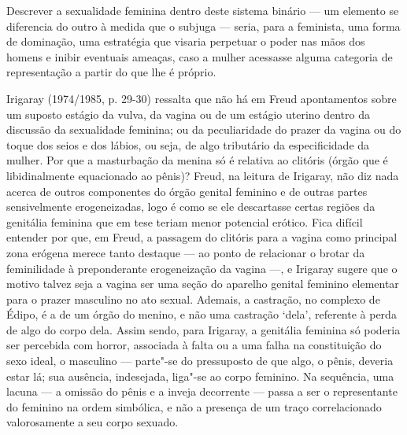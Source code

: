 Descrever a sexualidade feminina dentro deste sistema binário --- um
elemento se diferencia do outro à medida que o subjuga --- seria, para a
feminista, uma forma de dominação, uma estratégia que visaria perpetuar
o poder nas mãos dos homens e inibir eventuais ameaças, caso a mulher
acessasse alguma categoria de representação a partir do que lhe é
próprio.

Irigaray (1974/1985, p. 29-30) ressalta que não há em Freud
apontamentos sobre um suposto estágio da vulva, da vagina ou de um
estágio uterino dentro da discussão da sexualidade feminina; ou da
peculiaridade do prazer da vagina ou do toque dos seios e dos lábios, ou
seja, de algo tributário da especificidade da mulher. Por que a
masturbação da menina só é relativa ao clitóris (órgão que é
libidinalmente equacionado ao pênis)? Freud, na leitura de Irigaray, não
diz nada acerca de outros componentes do órgão genital feminino e de
outras partes sensivelmente erogeneizadas, logo é como se ele
descartasse certas regiões da genitália feminina que em tese teriam
menor potencial erótico. Fica difícil entender por que, em Freud, a
passagem do clitóris para a vagina como principal zona erógena merece
tanto destaque --- ao ponto de relacionar o brotar da feminilidade à
preponderante erogeneização da vagina ---, e Irigaray sugere que o
motivo talvez seja a vagina ser uma seção do aparelho genital feminino
elementar para o prazer masculino no ato sexual. Ademais, a castração,
no complexo de Édipo, é a de um órgão do menino, e não uma castração
`dela', referente à perda de algo do corpo dela. Assim sendo, para
Irigaray, a genitália feminina só poderia ser percebida com horror,
associada à falta ou a uma falha na constituição do sexo ideal, o
masculino --- parte"-se do pressuposto de que algo, o pênis, deveria estar
lá; sua ausência, indesejada, liga"-se ao corpo feminino. Na sequência,
uma lacuna --- a omissão do pênis e a inveja decorrente --- passa a ser o
representante do feminino na ordem simbólica, e não a presença de um
traço correlacionado valorosamente a seu corpo sexuado.

